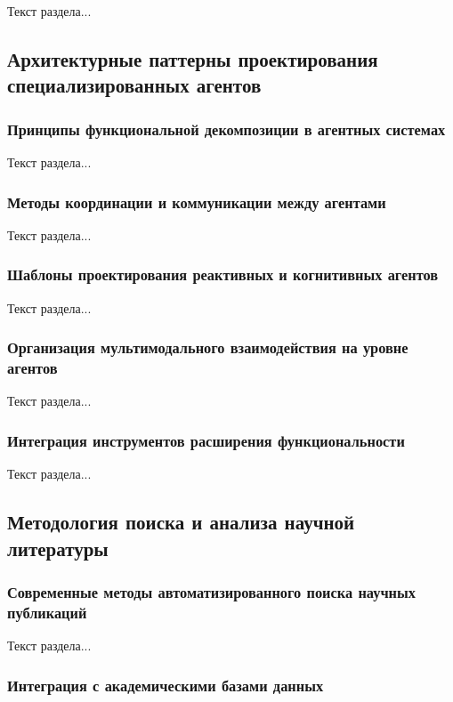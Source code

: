 Текст раздела...

\subsection{Архитектурные паттерны проектирования специализированных агентов}

\subsubsection{Принципы функциональной декомпозиции в агентных системах}

Текст раздела...

\subsubsection{Методы координации и коммуникации между агентами}

Текст раздела...

\subsubsection{Шаблоны проектирования реактивных и когнитивных агентов}

Текст раздела...

\subsubsection{Организация мультимодального взаимодействия на уровне агентов}

Текст раздела...

\subsubsection{Интеграция инструментов расширения функциональности}

Текст раздела...

\subsection{Методология поиска и анализа научной литературы}

\subsubsection{Современные методы автоматизированного поиска научных публикаций}

Текст раздела...

\subsubsection{Интеграция с академическими базами данных}

